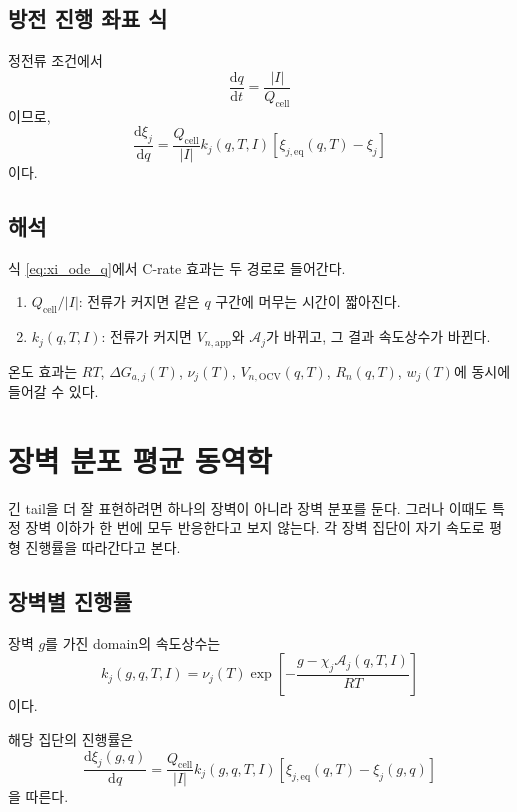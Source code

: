\documentclass[11pt,a4paper]{article}
\newcommand{\dd}{\mathrm{d}}
\newcommand{\OCV}{\mathrm{OCV}}
\newcommand{\app}{\mathrm{app}}
\newcommand{\eq}{\mathrm{eq}}
\newcommand{\cell}{\mathrm{cell}}
\begin{document}
\subsection{방전 진행 좌표 식}
정전류 조건에서
\begin{equation}
\frac{\dd q}{\dd t}=\frac{|I|}{Q_{\cell}}
\end{equation}
이므로,
\begin{equation}
\boxed{
\frac{\dd\xi_j}{\dd q}=\frac{Q_{\cell}}{|I|}k_j(q,T,I)\left[\xi_{j,\eq}(q,T)-\xi_j\right]
}
\label{eq:xi_ode_q}
\end{equation}
이다.

\subsection{해석}
식 \eqref{eq:xi_ode_q}에서 C-rate 효과는 두 경로로 들어간다.
\begin{enumerate}[label=\arabic*)]
\item \(Q_{\cell}/|I|\): 전류가 커지면 같은 \(q\) 구간에 머무는 시간이 짧아진다.
\item \(k_j(q,T,I)\): 전류가 커지면 \(V_{n,\app}\)와 \(\mathcal A_j\)가 바뀌고, 그 결과 속도상수가 바뀐다.
\end{enumerate}

온도 효과는 \(RT\), \(\Delta G_{a,j}(T)\), \(\nu_j(T)\), \(V_{n,\OCV}(q,T)\), \(R_n(q,T)\), \(w_j(T)\)에 동시에 들어갈 수 있다.

\section{장벽 분포 평균 동역학}
긴 tail을 더 잘 표현하려면 하나의 장벽이 아니라 장벽 분포를 둔다. 그러나 이때도 특정 장벽 이하가 한 번에 모두 반응한다고 보지 않는다. 각 장벽 집단이 자기 속도로 평형 진행률을 따라간다고 본다.

\subsection{장벽별 진행률}
장벽 \(g\)를 가진 domain의 속도상수는
\begin{equation}
k_j(g,q,T,I)=\nu_j(T)\exp\left[-\frac{g-\chi_j\mathcal A_j(q,T,I)}{RT}\right]
\label{eq:k_g}
\end{equation}
이다.

해당 집단의 진행률은
\begin{equation}
\frac{\dd\xi_j(g,q)}{\dd q}=\frac{Q_{\cell}}{|I|}k_j(g,q,T,I)\left[\xi_{j,\eq}(q,T)-\xi_j(g,q)\right]
\label{eq:xi_g_ode}
\end{equation}
을 따른다.
\end{document}
